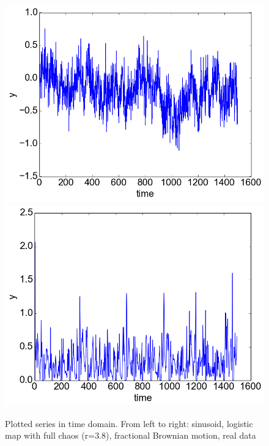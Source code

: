 \documentclass[12pt]{article}
\begin{document}
\begin{figure}
\begin{center}
    \includegraphics[scale=0.6]{plot_fbm}
    \includegraphics[scale=0.6]{plot_vr}
  \end{center}
  \caption{Plotted series in time domain. From left to right: sinusoid, logistic map with full chaos (r=3.8), fractional Brownian motion, real data}
\end{figure}
\end{document}
